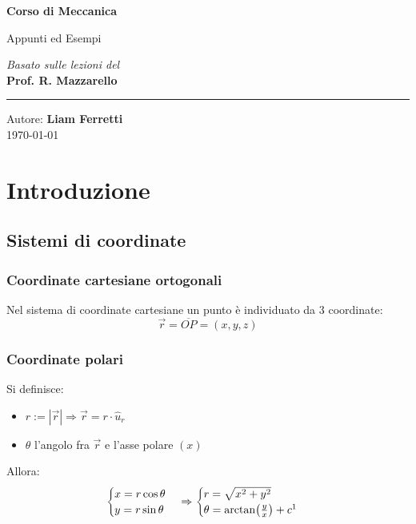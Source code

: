 \documentclass[11pt, a4paper, openright]{book}
\theoremstyle{plain}
\theoremstyle{definition}
\begin{document}
\begin{titlepage}
    \centering
    \vspace*{4cm}
    
    \Huge
    \textbf{Corso di Meccanica}
    
    \vspace{0.5cm}
    \LARGE
    Appunti ed Esempi
    
    \vspace{1.5cm}
    
    \textit{Basato sulle lezioni del} \\
    \Large \textbf{Prof. R. Mazzarello}
    
    \vfill
    
    \rule{\linewidth}{0.5pt}
    \vspace{0.5cm}
    
    \large
    Autore: \textbf{Liam Ferretti} \\
    \today
    
\end{titlepage}

\tableofcontents


\chapter{Introduzione}
\section{Sistemi di coordinate}
\subsection{Coordinate cartesiane ortogonali}
Nel sistema di coordinate cartesiane un punto è individuato da 3 coordinate:
\begin{equation}
    \vec{r} = \overline{OP} = (x, y ,z)
\end{equation}

\subsection{Coordinate polari}
Si definisce:
\begin{itemize}
    \item $r := |\vec{r}| \Rightarrow \vec{r} = r \cdot \hat{u}_r$
    \item $\theta$ l'angolo fra $\vec{r}$ e l'asse polare $(x)$
\end{itemize}
Allora:
\begin{equation}
    \begin{cases}
    x = r\cos\theta \\
    y = r\sin\theta \\
\end{cases} \Rightarrow \begin{cases}
    r = \sqrt{x^2 + y^2} \\
    \theta =  \arctan(\frac{y}{x}) + c\footnotemark\\
\end{cases}
\end{equation}
\end{document}
